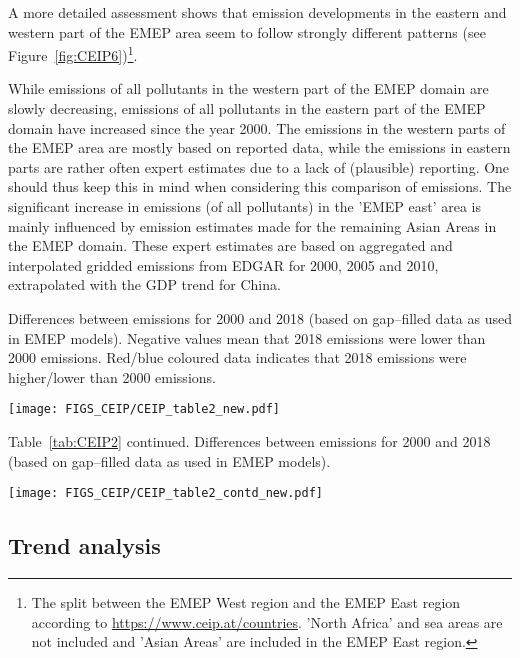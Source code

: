 A more detailed assessment shows that emission developments in the eastern and western part of the EMEP area seem to follow strongly different patterns (see Figure~\ref{fig:CEIP6})\footnote{The split between the EMEP West region and the EMEP East region according to \url{https://www.ceip.at/countries}. 'North Africa' and sea areas are not included and 'Asian Areas' are included in the EMEP East region.}.

While emissions of all pollutants in the western part of the EMEP domain are slowly decreasing, emissions of all pollutants in the eastern part of the EMEP domain have increased since the year 2000. The emissions in the western parts of the EMEP area are mostly based on reported data, while the emissions in eastern parts are rather often expert estimates due to a lack of (plausible) reporting. One should thus keep this in mind when considering this comparison of emissions. The significant increase in emissions (of all pollutants) in the 'EMEP east' area is mainly influenced by emission estimates made for the remaining Asian Areas in the EMEP domain. These expert estimates are based on aggregated and interpolated gridded emissions from EDGAR \citep{JRC2016} for 2000, 2005 and 2010, extrapolated with the GDP trend for China.

\begin{table}
  \caption{Differences between emissions for 2000 and 2018 (based on gap--filled data as used in EMEP models). Negative values mean that 2018 emissions were lower than 2000 emissions. Red/blue coloured data indicates that 2018 emissions were higher/lower than 2000 emissions.}
\centering
{\texttt{[image: FIGS\_CEIP/CEIP\_table2\_new.pdf]}}
\label{tab:CEIP2}  
\end{table}

\begin{table}
  \caption*{Table~\ref{tab:CEIP2} continued. Differences between emissions for 2000 and 2018 (based on gap--filled data as used in EMEP models).}
\centering
{\texttt{[image: FIGS\_CEIP/CEIP\_table2\_contd\_new.pdf]}}
\label{tab:CEIP2contd}  
\end{table}

\subsection{Trend analysis}

